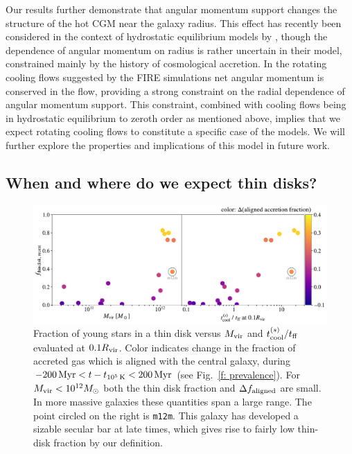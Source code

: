 \documentclass[fleqn,usenatbib]{mnras}
\newcommand{\tcools}{t_{10^5\,{\rm K}}}
\begin{document}
Our results further demonstrate that angular momentum support changes the structure of the hot CGM near the galaxy radius. This effect has recently been considered in the context of hydrostatic equilibrium models by \cite{Sormani2018}, though the dependence of angular momentum on radius is rather uncertain in their model, constrained mainly by the history of cosmological accretion. In the rotating cooling flows suggested by the FIRE simulations net angular momentum is conserved in the flow, providing a strong constraint on the radial dependence of angular momentum support. This constraint, combined with cooling flows being in hydrostatic equilibrium to zeroth order as mentioned above, implies that we expect rotating cooling flows to constitute a specific case of the \cite{Sormani2018} models. We will further explore the properties and implications of this model in future work.

\subsection{When and where do we expect thin disks?}

\begin{figure}
    \centering
    \includegraphics[width=\textwidth]{figures/prevalence/aligned_fraction_vs_galaxy_props.pdf}
    \caption{
    Fraction of young stars in a thin disk versus $M_{\rm vir}$ and $t_{\rm cool}^{(s)}/t_{\rm ff}$ evaluated at $0.1 R_{\rm vir}$.
    Color indicates change in the fraction of accreted gas which is aligned with the central galaxy, during $-200\,{\rm Myr} < t-\tcools < 200\,{\rm Myr}$ (see Fig.~\ref{f: prevalence}).
    For $M_{\rm vir} < 10^{12} M_\odot$ both the thin disk fraction and $\Delta f_{\rm aligned}$ are small.
    In more massive galaxies these quantities span a large range.
    The point circled on the right is \texttt{m12m}.
    This galaxy has developed a sizable secular bar at late times, which gives rise to fairly low thin-disk fraction by our definition. 
    }
    \label{f: prevalence vs galaxy properties}
\end{figure}
\end{document}
